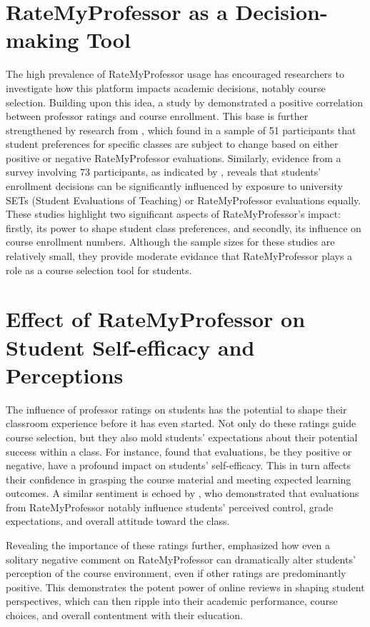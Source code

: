 \documentclass[twocolumn, doc,12pt]{apa7}
\begin{document}
\section{RateMyProfessor as a Decision-making Tool}
The high prevalence of RateMyProfessor usage has encouraged researchers to investigate how this platform impacts academic decisions, notably course selection. Building upon this idea, a study by \textcite{johnson_i_2014} demonstrated a positive correlation between professor ratings and course enrollment. This base is further strengthened by research from \textcite{orlova_ratemyprofessorscom_2021}, which found in a sample of 51 participants that student preferences for specific classes are subject to change based on either positive or negative RateMyProfessor evaluations. Similarly, evidence from a survey involving 73 participants, as indicated by \textcite{boswell_effects_2020}, reveals that students' enrollment decisions can be significantly influenced by exposure to university SETs (Student Evaluations of Teaching) or RateMyProfessor evaluations equally. These studies highlight two significant aspects of RateMyProfessor's impact: firstly, its power to shape student class preferences, and secondly, its influence on course enrollment numbers. Although the sample sizes for these studies are relatively small, they provide moderate evidance that RateMyProfessor plays a role as a course selection tool for students.

\section{Effect of RateMyProfessor on Student Self-efficacy and Perceptions}
The influence of professor ratings on students has the potential to shape their classroom experience before it has even started. Not only do these ratings guide course selection, but they also mold students' expectations about their potential success within a class. For instance, \textcite{boswell_effects_2020} found that evaluations, be they positive or negative, have a profound impact on students' self-efficacy. This in turn affects their confidence in grasping the course material and meeting expected learning outcomes. A similar sentiment is echoed by \textcite{kowai-bell_rate_2011}, who demonstrated that evaluations from RateMyProfessor notably influence students' perceived control, grade expectations, and overall attitude toward the class.

Revealing the importance of these ratings further, \textcite{scherr_single_2013} emphasized how even a solitary negative comment on RateMyProfessor can dramatically alter students' perception of the course environment, even if other ratings are predominantly positive. This demonstrates the potent power of online reviews in shaping student perspectives, which can then ripple into their academic performance, course choices, and overall contentment with their education.
\end{document}
